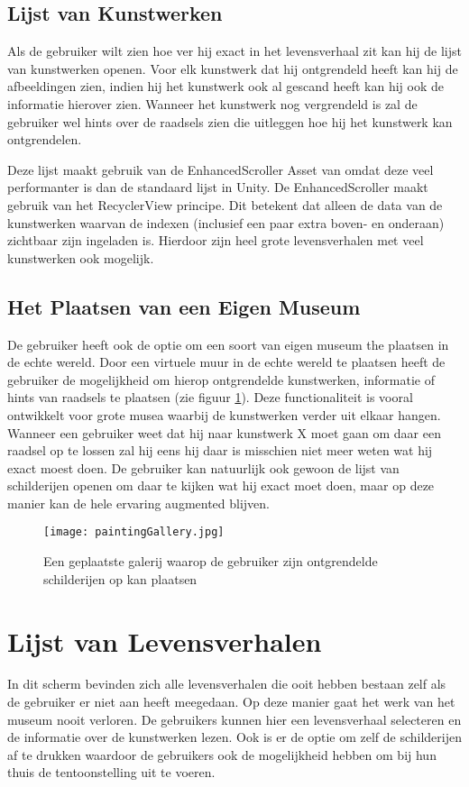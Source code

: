 \subsection{Lijst van Kunstwerken}
Als de gebruiker wilt zien hoe ver hij exact in het levensverhaal zit kan hij de lijst van kunstwerken openen. Voor elk kunstwerk dat hij ontgrendeld heeft kan hij de afbeeldingen zien, indien hij het kunstwerk ook al gescand heeft kan hij ook de informatie hierover zien. Wanneer het kunstwerk nog vergrendeld is zal de gebruiker wel hints over de raadsels zien die uitleggen hoe hij het kunstwerk kan ontgrendelen.

Deze lijst maakt gebruik van de EnhancedScroller Asset van \textcite{EchoScroller} omdat deze veel performanter is dan de standaard lijst in Unity. De EnhancedScroller maakt gebruik van het RecyclerView principe. Dit betekent dat alleen de data van de kunstwerken waarvan de indexen (inclusief een paar extra boven- en onderaan) zichtbaar zijn ingeladen is. Hierdoor zijn heel grote levensverhalen met veel kunstwerken ook mogelijk.

\subsection{Het Plaatsen van een Eigen Museum}
De gebruiker heeft ook de optie om een soort van eigen museum the plaatsen in de echte wereld. Door een virtuele muur in de echte wereld te plaatsen heeft de gebruiker de mogelijkheid om hierop ontgrendelde kunstwerken, informatie of hints van raadsels te plaatsen (zie figuur \ref{fig:paintingGallery}). Deze functionaliteit is vooral ontwikkelt voor grote musea waarbij de kunstwerken verder uit elkaar hangen. Wanneer een gebruiker weet dat hij naar kunstwerk X moet gaan om daar een raadsel op te lossen zal hij eens hij daar is misschien niet meer weten wat hij exact moest doen. De gebruiker kan natuurlijk ook gewoon de lijst van schilderijen openen om daar te kijken wat hij exact moet doen, maar op deze manier kan de hele ervaring augmented blijven.

\begin{figure}
    \centering
    \texttt{[image: paintingGallery.jpg]}
    \caption{Een geplaatste galerij waarop de gebruiker zijn ontgrendelde schilderijen op kan plaatsen}
    \label{fig:paintingGallery}
\end{figure}

\section{Lijst van Levensverhalen}
In dit scherm bevinden zich alle levensverhalen die ooit hebben bestaan zelf als de gebruiker er niet aan heeft meegedaan. Op deze manier gaat het werk van het museum nooit verloren. De gebruikers kunnen hier een levensverhaal selecteren en de informatie over de kunstwerken lezen. Ook is er de optie om zelf de schilderijen af te drukken waardoor de gebruikers ook de mogelijkheid hebben om bij hun thuis de tentoonstelling uit te voeren.